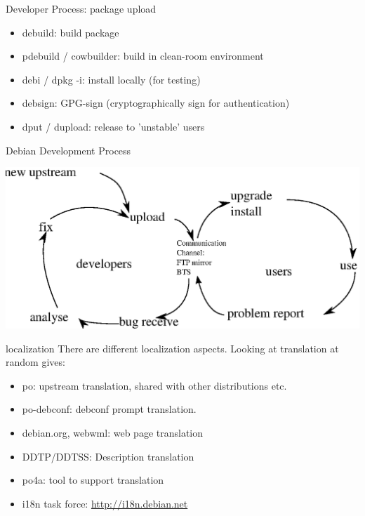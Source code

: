 \documentclass[cjk,dvipdfmx,12pt]{beamer}
\begin{document}
\begin{frame}{Developer Process: package upload}
\begin{itemize}
 \item debuild: build package
 \item pdebuild / cowbuilder: build in clean-room environment
 \item debi / dpkg -i: install locally (for testing)
 \item debsign: GPG-sign (cryptographically sign for authentication)
 \item dput / dupload: release to 'unstable' users
\end{itemize}
\end{frame}

\begin{frame}{Debian Development Process}

 \includegraphics[width=1\hsize]{image200805/develcycle.eps} 

\end{frame}

\begin{frame}{localization}
 There are different localization aspects. Looking at translation at
 random gives:
\begin{itemize}
 \item po: upstream translation, shared with other distributions etc.
 \item po-debconf: debconf prompt translation.
 \item debian.org, webwml: web page translation
 \item DDTP/DDTSS: Description translation
 \item po4a: tool to support translation
 \item i18n task force: \url{http://i18n.debian.net}
\end{itemize}
\end{frame}
\end{document}
